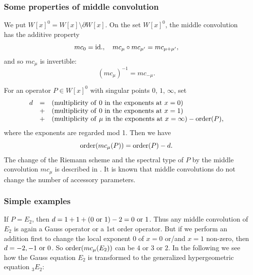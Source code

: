 \documentclass[a4paper,12pt]{article}
\theoremstyle{definition}
\theoremstyle{remark}
\numberwithin{equation}{section} %
\begin{document}
\subsubsection{Some properties of middle convolution}
We put $W[x]^0=W[x]\setminus\partial W[x]$.
On the set $W[x]^0$, the middle convolution has the additive property
$$
 mc_0={\rm id.},\quad
 mc_{\mu}\circ mc_{\mu'}=mc_{\mu+\mu'},
$$
and so $mc_{\mu}$ is invertible:
$$
(mc_{\mu})^{-1}=mc_{-\mu}.
$$

\noindent
For an operator $P\in W[x]^0$ with singular points $0$, $1$, $\infty$, set
$$\begin{array}{lcl}
  d&=&({\rm multiplicity\ of\ }0{\ \rm in\ the\ exponents\ at\ }x=0)\\
  & +&({\rm multiplicity\ of\ }0{\ \rm in\ the\ exponents\ at\ }x=1)\\
  & +&({\rm multiplicity\ of\ }\mu{\ \rm in\ the\ exponents\ at\ }x=\infty)-{\rm order}(P),\end{array}
$$     %
where the exponents are regarded mod 1.
Then we have
  $${\rm order}(mc_{\mu}(P))={\rm order}(P)-d.$$
The change of the Riemann scheme and the spectral type of $P$ by the middle convolution $mc_{\mu}$
is described in \cite[Theorem 5.2]{Osh}. 
It is known  that middle convolutions do not change the number of accessory parameters.



\subsubsection{Simple  examples}
  If $P=E_2$, then $d=1+1+(0{\ \rm or\ }1)-2=0{\ \rm or\ }1$.
  Thus any middle convolution of $E_2$ is again a Gauss operator
  or a 1st order operator. But if we perform an addition first
  to change the local exponent 0 of $x=0$ or/and $x=1$ non-zero,
  then $d=-2,-1{\ \rm or\ }0$. %
  So
  ${\rm order}(mc_{\mu}(E_2))$ can be $4$ or $3$ or $2$. In the following we see how the Gauss equation $E_2$ is transformed to the generalized hypergeometric equation ${}_3E_2$:
\end{document}
